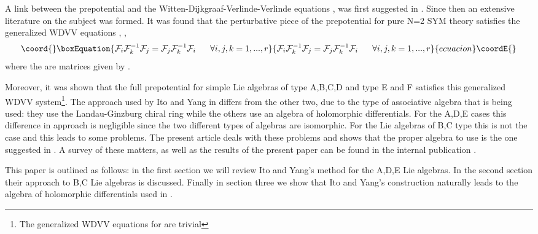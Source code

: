 \documentclass[a4paper,11pt]{article}
\numberwithin{equation}{section}
\begin{document}
\bigskip
\noindent 
A link between the prepotential and the Witten-Dijkgraaf-Verlinde-Verlinde
equations \cite{WITT:1991},\cite{DIJK-VERL-VERL:1991} was first suggested in
\cite{BONE-MATO:1996}. Since then an extensive literature on the subject was
formed. It was found that the perturbative piece of the prepotential
\coordHE{} for pure N=2 SYM theory satisfies the
generalized WDVV equations \cite{MARS-MIRO-MORO:1996},\cite{MART-GRAG:1999}%
,\cite{VESE:1999}
\begin{equation}\coord{}\boxEquation{
\mathcal{F}_{i}\mathcal{F}_{k}^{-1}\mathcal{F}_{j}=\mathcal{F}_{j}
\mathcal{F}_{k}^{-1}\mathcal{F}_{i}\text{ \ \ \ \ }\forall i,j,k=1,...,r
}{
\mathcal{F}_{i}\mathcal{F}_{k}^{-1}\mathcal{F}_{j}=\mathcal{F}_{j}
\mathcal{F}_{k}^{-1}\mathcal{F}_{i}\text{ \ \ \ \ }\forall i,j,k=1,...,r
}{ecuacion}\coordE{}\end{equation}
where the \coordHE{} are matrices given by \coordHE{}.

\noindent
Moreover, it was shown that the full prepotential for simple Lie algebras of
type A,B,C,D \cite{MARS-MIRO-MORO:2000} and type E
\cite{ITO-YANG:1998} and F \cite{HOEV-KERS-MART:2000} satisfies this
generalized WDVV system\footnote{The generalized WDVV equations for
  \coordHE{} are trivial}. The approach used by Ito and Yang in \cite{ITO-YANG:1998}
differs from the other two, due to the type of associative algebra
that is being used: they use the Landau-Ginzburg chiral ring while the 
others use an algebra of holomorphic differentials. For the A,D,E
cases this difference in approach is negligible since the two
different types of algebras are isomorphic. For the Lie
algebras of B,C type this is not the case and this leads to some
problems. The present article deals with these problems and shows that 
the proper algebra to use is the one suggested in \cite{MARS-MIRO-MORO:2000}. 
A survey of these matters, as well as the results of the
present paper can be found in the internal publication \cite{HOEV-MART:2000}.

\bigskip
\noindent
This paper is outlined as follows: in the first section we will review 
Ito and Yang's method for the A,D,E Lie algebras. In the second
section their approach to B,C Lie algebras is discussed. Finally in
section three we show that Ito and Yang's construction naturally
leads to the algebra of holomorphic differentials used in
\cite{MARS-MIRO-MORO:2000}.
\end{document}
